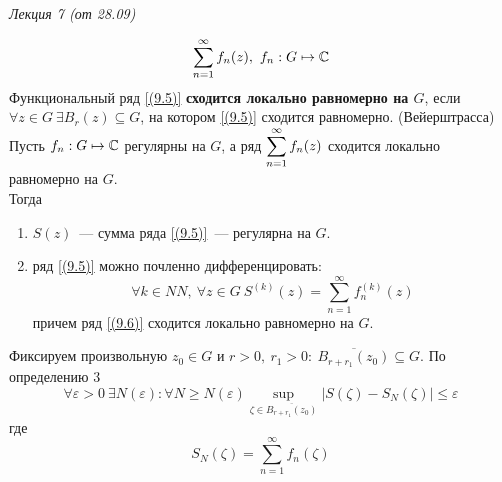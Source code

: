 \begin{flushright}
    \textit{Лекция 7 (от 28.09)}
\end{flushright}
\begin{equation}\label{(9.5)}
    \sum_{n=1}^{\infty}f_n(z), \ f_n: G \mapsto \mathbb{C}
\end{equation}
\Def
Функциональный ряд \eqref{(9.5)} \textbf{сходится локально равномерно на $G$},
если $\forall z \in G \ \exists B_r(z) \subseteq G$, на котором \eqref{(9.5)}
сходится равномерно.
\theorem (Вейерштрасса)
Пусть $f_n: G \mapsto \mathbb{C}$ регулярны на $G$, а ряд $\displaystyle
\sum_{n=1}^{\infty}f_n(z)$ сходится локально равномерно на $G$.
\\
Тогда
\begin{enumerate}
    \item $S(z)$~--- сумма ряда \eqref{(9.5)}~--- регулярна на $G$.
    \item ряд \eqref{(9.5)} можно почленно дифференцировать:
    \begin{equation}\label{(9.6)}
        \forall k \in NN, \ \forall z \in G \ S^{(k)}(z) = \sum_{n=1}^{\infty}f^{(k)}_n(z)
    \end{equation}
    причем ряд \eqref{(9.6)} сходится локально равномерно на $G$.
\end{enumerate}
\pr
Фиксируем произвольную $z_0 \in G$ и $r>0, \ r_1>0: \ \overline{B_{r+r_1}(z_0)}
\subseteq G$. По определению $3$
\begin{equation}\label{(9.7)}
    \forall \varepsilon > 0 \ \exists N(\varepsilon): \forall N \geq N(\varepsilon) \sup_{\zeta \in \overline{B_{r+r_1}(z_0)}}\left| S(\zeta) - S_N(\zeta) \right| \leq \varepsilon
\end{equation}
где
\begin{equation}\label{(9.8)}
    S_N(\zeta) = \sum_{n=1}^{\infty}f_n(\zeta)
\end{equation}
